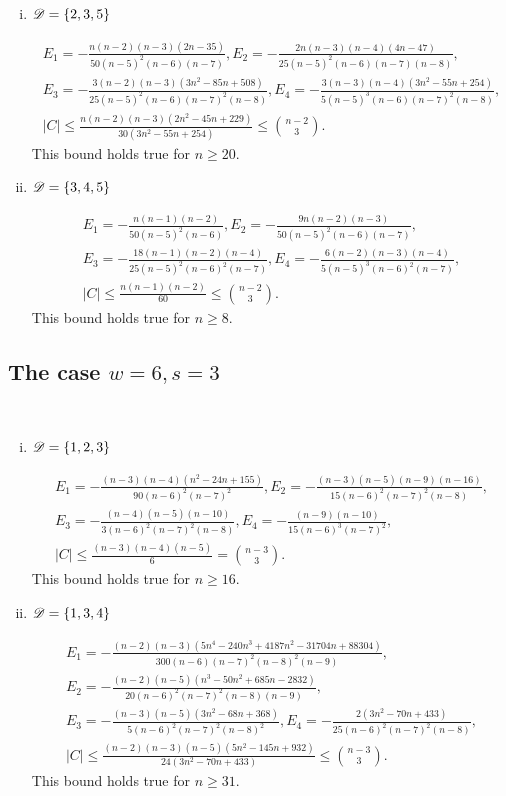 \documentclass{amsart}
\begin{document}
{\begin{enumerate}[(i)]
\item $\mathscr{D}=\{2,3,5\}$

\begin{gather*}
E_1=-\frac{n(n-2)(n-3)(2n-35)}{50(n-5)^2 (n-6) (n-7)}, E_2=-\frac{2n(n-3)(n-4)(4n-47)}{25(n-5)^2(n-6)(n-7)(n-8)},\\ E_3=-\frac{3(n-2)(n-3)\left(3n^2-85n+508\right)}{25(n-5)^2(n-6)(n-7)^2(n-8)},
E_4=-\frac{3(n-3)(n-4)\left(3n^2-55n+254\right)}{5(n-5)^3(n-6)(n-7)^2(n-8)},\\
|C|\le \frac{n(n-2)(n-3)\left(2n^2-45n+229\right)}{30\left(3n^2-55n+254\right)}\le \binom{n-2}{3}.
\end{gather*}
This bound holds true for $n\ge 20.$

\item $\mathscr{D}=\{3,4,5\}$

\begin{gather*}
E_1=-\frac{n(n-1)(n-2)}{50(n-5)^2 (n-6)}, E_2=-\frac{9n(n-2)(n-3)}{50(n-5)^2(n-6)(n-7)},\\ E_3=-\frac{18(n-1)(n-2)(n-4)}{25(n-5)^2(n-6)^2(n-7)},
E_4=-\frac{6(n-2)(n-3)(n-4)}{5(n-5)^3(n-6)^2(n-7)},\\
|C|\le \frac{n(n-1)(n-2)}{60}\le \binom{n-2}{3}.
\end{gather*}
This bound holds true for $n\ge 8.$

\end{enumerate}

\subsection{The case \texorpdfstring{$w=6,s=3$}.}  \label{App:6,3}\hfill\\
\begin{enumerate}[(i)]
\item $\mathscr{D}=\{1,2,3\}$

\begin{gather*}
E_1=-\frac{(n-3)(n-4)\left(n^2-24n+155\right)}{90(n-6)^2 (n-7)^2}, E_2=-\frac{(n-3)(n-5)(n-9)(n-16)}{15(n-6)^2(n-7)^2(n-8)},\\ E_3=-\frac{(n-4)(n-5)(n-10)}{3(n-6)^2(n-7)^2(n-8)},
E_4=-\frac{(n-9)(n-10)}{15(n-6)^3(n-7)^2},\\
|C|\le \frac{(n-3)(n-4)(n-5)}{6}= \binom{n-3}{3}.
\end{gather*}
This bound holds true for $n\ge 16.$

\item $\mathscr{D}=\{1,3,4\}$

\begin{gather*}
E_1=-\frac{(n-2)(n-3)\left(5n^4-240n^3+4187n^2-31704n+88304\right)}{300(n-6) (n-7)^2(n-8)^2(n-9)},\\ E_2=-\frac{(n-2)(n-5)\left(n^3-50n^2+685n-2832\right)}{20(n-6)^2(n-7)^2(n-8)(n-9)},\\ E_3=-\frac{(n-3)(n-5)\left(3n^2-68n+368\right)}{5(n-6)^2(n-7)^2(n-8)^2},
E_4=-\frac{2\left(3n^2-70n+433\right)}{25(n-6)^2(n-7)^2(n-8)},\\
|C|\le \frac{(n-2)(n-3)(n-5)\left(5n^2-145n+932\right)}{24\left(3n^2-70n+433\right)} \leq \binom{n-3}{3}.
\end{gather*}
This bound holds true for $n\ge 31.$


\end{enumerate}}
\end{document}
